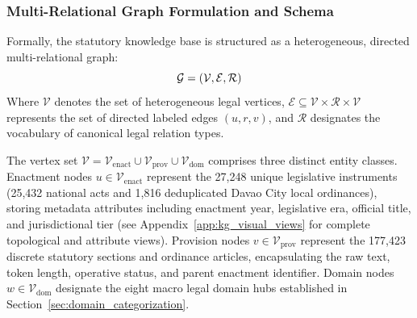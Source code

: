         \subsubsection{Multi-Relational Graph Formulation and Schema}
        \label{sec:graph_formulation_schema}
        Formally, the statutory knowledge base is structured as a heterogeneous, directed multi-relational graph:
        \begin{equation}
            \mathcal{G} = (\mathcal{V}, \mathcal{E}, \mathcal{R})
            \label{eq:knowledge_graph_definition}
            \eqcaption{Multi-Relational Statutory Knowledge Graph Formulation}
        \end{equation}
        \noindent Where $\mathcal{V}$ denotes the set of heterogeneous legal vertices, $\mathcal{E} \subseteq \mathcal{V} \times \mathcal{R} \times \mathcal{V}$ represents the set of directed labeled edges $(u, r, v)$, and $\mathcal{R}$ designates the vocabulary of canonical legal relation types.

        The vertex set $\mathcal{V} = \mathcal{V}_{\text{enact}} \cup \mathcal{V}_{\text{prov}} \cup \mathcal{V}_{\text{dom}}$ comprises three distinct entity classes. Enactment nodes $u \in \mathcal{V}_{\text{enact}}$ represent the 27,248 unique legislative instruments (25,432 national acts and 1,816 deduplicated Davao City local ordinances), storing metadata attributes including enactment year, legislative era, official title, and jurisdictional tier (see Appendix~\ref{app:kg_visual_views} for complete topological and attribute views). Provision nodes $v \in \mathcal{V}_{\text{prov}}$ represent the 177,423 discrete statutory sections and ordinance articles, encapsulating the raw text, token length, operative status, and parent enactment identifier. Domain nodes $w \in \mathcal{V}_{\text{dom}}$ designate the eight macro legal domain hubs established in Section~\ref{sec:domain_categorization}.

